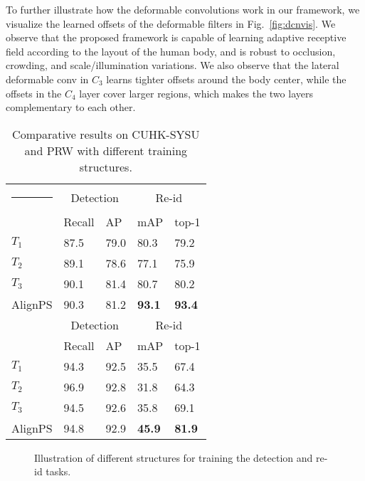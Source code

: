 \documentclass[journal]{IEEEtran}
\makeatletter
\newcommand{\thickhline}{\noalign {\ifnum 0=`}\fi \hrule height 1pt
    \futurelet \reserved@a \@xhline
}
\makeatother
\begin{document}
To further illustrate how the deformable convolutions work in our framework, we visualize the learned offsets of the deformable filters in Fig.~\ref{fig:dcnvis}. We observe that the proposed framework is capable of learning adaptive receptive field according to the layout of the human body, and is robust to occlusion, crowding, and scale/illumination variations. We also observe that the lateral deformable conv in $C_3$ learns tighter offsets around the body center, while the offsets in the $C_4$ layer cover larger regions, which makes the two layers complementary to each other. 

\begin{table}[t]
\small
\centering
\begin{tabular}{p{1.9cm}|p{1.1cm}<{\centering}p{1.1cm}<{\centering}|p{1.1cm}<{\centering}p{1.1cm}<{\centering}}
\hline\thickhline
\rowcolor{mygray} 
  & \multicolumn{2}{c|}{Detection} & \multicolumn{2}{c}{Re-id}   \\ \cline{2-5} 
\rowcolor{mygray} 
\multirow{-2}{*}{CUHK-SYSU}  & Recall & AP  & mAP  & top-1  \\  \hline \hline     
$T_1$
   & 87.5   & 79.0       & 80.3   & 79.2   \\
$T_2$  & 89.1   & 78.6      & 77.1   & 75.9    \\ 
$T_3$  & 90.1   & 81.4       & 80.7   & 80.2  \\
AlignPS  & 90.3    & 81.2 &\textbf{93.1} & \textbf{93.4}\\\hline \hline
\rowcolor{mygray} 
  & \multicolumn{2}{c|}{Detection} & \multicolumn{2}{c}{Re-id}   \\ \cline{2-5} 
\rowcolor{mygray} 
\multirow{-2}{*}{PRW}  & Recall & AP  & mAP  & top-1  \\  \hline \hline        
$T_1$
   &  94.3   &  92.5       & 35.5   & 67.4   \\
$T_2$  & 96.9     & 92.8     & 31.8   & 64.3    \\ 
$T_3$  &  94.5  &  92.6     & 35.8   & 69.1\\
AlignPS  &  94.8   & 92.9  &\textbf{45.9} & \textbf{81.9}\\\hline
\end{tabular}
\caption{Comparative results on CUHK-SYSU and PRW with different training structures. }
\label{tab:tasks}
\end{table}

\begin{figure}[t]
\vspace{-5mm}
\centering
{}
 \hfill
{}
 \hfill
{}
 \hfill
{}
 \caption{Illustration of different structures for training the detection and re-id tasks.}
 \label{fig:tasks}
\end{figure}
\end{document}
